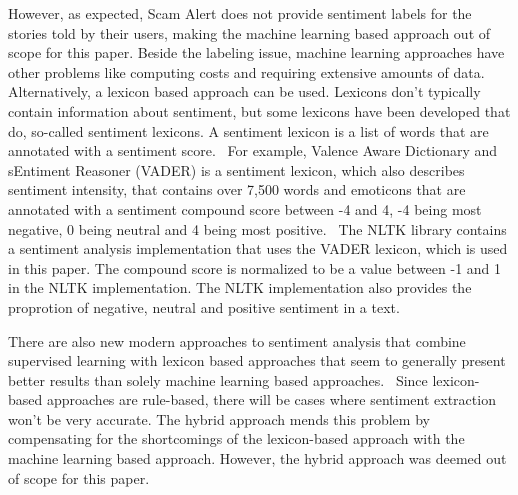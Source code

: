 However, as expected, Scam Alert does not provide sentiment labels for the stories told by their users, making the machine learning based approach out of scope for this paper. Beside the labeling issue, machine learning approaches have other problems like computing costs and requiring extensive amounts of data.~\cite{hutto2014vader} Alternatively, a lexicon based approach can be used. Lexicons don't typically contain information about sentiment, but some lexicons have been developed that do, so-called sentiment lexicons. A sentiment lexicon is a list of words that are annotated with a sentiment score.~\cite{bonta2019comprehensive} For example, Valence Aware Dictionary and sEntiment Reasoner (VADER) is a sentiment lexicon, which also describes sentiment intensity, that contains over 7,500 words and emoticons that are annotated with a sentiment compound score between -4 and 4, -4 being most negative, 0 being neutral and 4 being most positive.~\cite{hutto2014vader} The NLTK library contains a sentiment analysis implementation that uses the VADER lexicon, which is used in this paper. The compound score is normalized to be a value between -1 and 1 in the NLTK implementation. The NLTK implementation also provides the proprotion of negative, neutral and positive sentiment in a text.

\begin{table}
    \centering
    \caption{Examples of sentiment analysis results on different unprocessed texts.}
    \label{tab:sentiment_analysis_example}
\end{table}

There are also new modern approaches to sentiment analysis that combine supervised learning with lexicon based approaches that seem to generally present better results than solely machine learning based approaches.~\cite{ahmad2017hybrid} Since lexicon-based approaches are rule-based, there will be cases where sentiment extraction won't be very accurate. The hybrid approach mends this problem by compensating for the shortcomings of the lexicon-based approach with the machine learning based approach. However, the hybrid approach was deemed out of scope for this paper.

